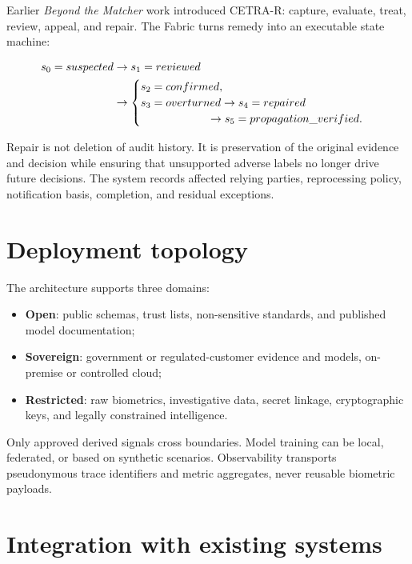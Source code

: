 Earlier \emph{Beyond the Matcher} work introduced CETRA-R: capture, evaluate, treat, review, appeal, and repair. The Fabric turns remedy into an executable state machine:

\begin{equation}
\begin{aligned}
s_0=suspected&\rightarrow s_1=reviewed\\
&\rightarrow
\begin{cases}
s_2=confirmed,\\
s_3=overturned\rightarrow s_4=repaired\\
\hspace{22mm}\rightarrow s_5=propagation\_verified.
\end{cases}
\end{aligned}
\end{equation}

Repair is not deletion of audit history. It is preservation of the original evidence and decision while ensuring that unsupported adverse labels no longer drive future decisions. The system records affected relying parties, reprocessing policy, notification basis, completion, and residual exceptions.

\section{Deployment topology}

The architecture supports three domains:

\begin{itemize}
\item \textbf{Open}: public schemas, trust lists, non-sensitive standards, and published model documentation;
\item \textbf{Sovereign}: government or regulated-customer evidence and models, on-premise or controlled cloud;
\item \textbf{Restricted}: raw biometrics, investigative data, secret linkage, cryptographic keys, and legally constrained intelligence.
\end{itemize}

Only approved derived signals cross boundaries. Model training can be local, federated, or based on synthetic scenarios. Observability transports pseudonymous trace identifiers and metric aggregates, never reusable biometric payloads.

\section{Integration with existing systems}

